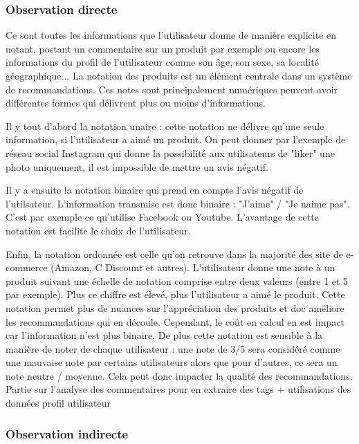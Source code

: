 \documentclass{report}
\begin{document}
\subsubsection{Observation directe}
Ce sont toutes les informations que l'utilisateur donne de manière explicite en notant, postant un commentaire sur un produit par exemple ou encore les informations du profil de l'utilisateur comme son âge, son sexe, sa localité géographique...
La notation des produits est un élément centrale dans un système de recommandations. Ces notes sont principalement numériques peuvent avoir différentes formes qui délivrent plus ou moins d'informations.
\vspace{0.5cm}
\par Il y tout d'abord la notation unaire : cette notation ne délivre qu'une seule information, si l'utilisateur a aimé un produit. On peut donner par l'exemple de réseau social Instagram qui donne la possibilité aux utilisateurs de "liker" une photo uniquement, il est impossible de mettre un avis négatif.
\par Il y a ensuite la notation binaire  qui prend en compte l'avis négatif de l'utilsateur. L'information transmise est donc binaire : "J'aime" / "Je naime pas". C'est par exemple ce qu'utilise Facebook ou Youtube. L'avantage de cette notation est facilite le choix de l'utilisateur.
\par Enfin, la notation ordonnée est celle qu'on retrouve dans la majorité des site de e-commerce (Amazon, C Discount et autres). L'utilisateur donne une note à un produit suivant une échelle de notation comprise entre deux valeurs (entre 1 et 5 par exemple). Plus ce chiffre est élevé, plus l'utilisateur a aimé le produit. Cette notation permet plus de nuances sur l'appréciation des produits et doc améliore les recommandations qui en découle.
Cependant, le coût en calcul en est impact car l'information n'est plus binaire. De plus cette notation est sensible à la manière de noter de chaque utilisateur : une note de 3/5 sera considéré comme une mauvaise note par certains utilisateurs alors que pour d'autres, ce sera un note neutre / moyenne. Cela peut donc impacter la qualité des recommandations.
\vspace{0.5cm}
Partie sur l'analyse des commentaires pour en extraire des tags + utilisations des données profil utilisateur
\subsubsection{Observation indirecte}
\end{document}
